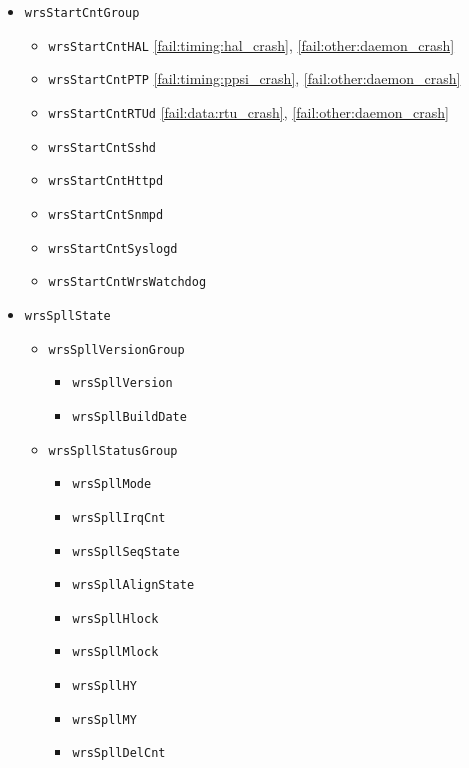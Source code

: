\begin{itemize}
  \item \texttt{wrsStartCntGroup}
    \begin{itemize}
      \item \texttt{wrsStartCntHAL} \ref{fail:timing:hal_crash}, \ref{fail:other:daemon_crash}
      \item \texttt{wrsStartCntPTP} \ref{fail:timing:ppsi_crash}, \ref{fail:other:daemon_crash}
      \item \texttt{wrsStartCntRTUd} \ref{fail:data:rtu_crash}, \ref{fail:other:daemon_crash}
      \item \texttt{wrsStartCntSshd}
      \item \texttt{wrsStartCntHttpd}
      \item \texttt{wrsStartCntSnmpd}
      \item \texttt{wrsStartCntSyslogd}
      \item \texttt{wrsStartCntWrsWatchdog}
    \end{itemize}

  \item \texttt{wrsSpllState}
    \begin{itemize}
      \item \texttt{wrsSpllVersionGroup}
	\begin{itemize}
	  \item \texttt{wrsSpllVersion}
	  \item \texttt{wrsSpllBuildDate}
	\end{itemize}
      \item \texttt{wrsSpllStatusGroup}
	\begin{itemize}
	  \item \texttt{wrsSpllMode}
	  \item \texttt{wrsSpllIrqCnt}
	  \item \texttt{wrsSpllSeqState}
	  \item \texttt{wrsSpllAlignState}
	  \item \texttt{wrsSpllHlock}
	  \item \texttt{wrsSpllMlock}
	  \item \texttt{wrsSpllHY}
	  \item \texttt{wrsSpllMY}
	  \item \texttt{wrsSpllDelCnt}
	\end{itemize}
    \end{itemize}


\end{itemize}
